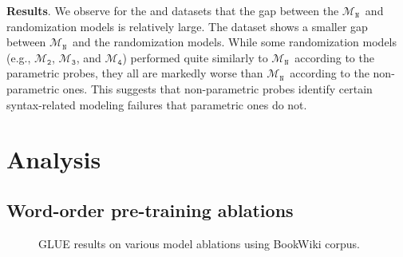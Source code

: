 \documentclass[letterpaper, 12pt]{report}
\newcommand{\xhdr}[1]{{\noindent\bfseries #1}.}
\newcommand{\OR}{$\mathcal{M}_{\texttt{N}}$}
\newcommand{\RII}{$\mathcal{M}_{\texttt{2}}$}
\newcommand{\RIII}{$\mathcal{M}_{\texttt{3}}$}
\newcommand{\RIV}{$\mathcal{M}_{\texttt{4}}$}
\begin{document}
\xhdr{Results}
We observe for the \citet{linzen-etal-2016-assessing} and \citet{marvin-linzen-2018-targeted} datasets that the gap between the \OR\ and randomization models is relatively large.
The \citet{gulordava2018} dataset shows a smaller gap between \OR\ and the randomization models. While some randomization models (e.g., \RII, \RIII, and \RIV) performed quite similarly to \OR\ according to the parametric probes, they all are markedly worse than \OR\ according to the non-parametric ones. This suggests that non-parametric probes identify certain syntax-related modeling failures
that parametric ones do not.



\section{Analysis}
\label{sec:mlm_analysis}


\subsection{Word-order pre-training ablations}
\label{sec:mlm_ablations}



\begin{figure}[t]
    \centering
    \caption{GLUE results on various model ablations using BookWiki corpus.}
    \label{fig:mlm_all_glue_plot}
\end{figure}
\end{document}
